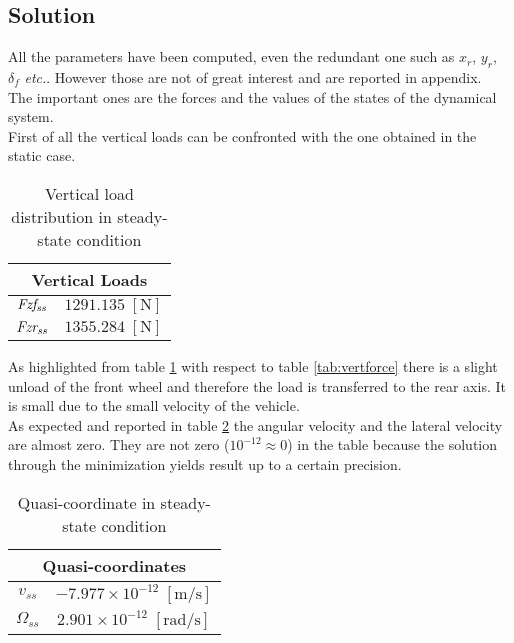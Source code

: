 \subsection{Solution}
%
All the parameters have been computed, even the redundant one such as $x_r$, $y_r$, $\delta_f$ \textit{etc.}. However those are not of great interest and are reported in appendix.\\ %
The important ones are the forces and the values of the states of the dynamical system.\\
First of all the vertical loads can be confronted with the one obtained in the static case.

%
\begin{table}[h!]
    \centering
    \begin{tabular}{@{}cc@{}}
    \toprule
    \multicolumn{2}{c}{\textbf{Vertical Loads}} \\ \midrule
    ${\it Fzf_{ss}}$  & $1291.135 \; [\si{\newton}]$ \\
    ${\it Fzr_{ss}}$  & $1355.284 \; [\si{\newton}]$ \\ \bottomrule
    \end{tabular}
    \caption{Vertical load distribution in steady-state condition}
    \label{tab:vertforceSS}
\end{table}
%
As highlighted from table \ref{tab:vertforceSS} with respect to table \ref{tab:vertforce} there is a slight unload of the front wheel and therefore the load is transferred to the rear axis. It is small due to the small velocity of the vehicle.\\
As expected and reported in table \ref{tab:QC-SS} the angular velocity and the lateral velocity are almost zero. They are not zero ($10^{-12}\approx 0$) in the table because the solution through the minimization yields result up to a certain precision.

%
\begin{table}[h!]
    \centering
    \begin{tabular}{@{}cc@{}}
    \toprule
    \multicolumn{2}{c}{\textbf{Quasi-coordinates}} \\ \midrule
    ${ v_{ss}    }$  & $-7.977\times10^{-12}  \; [\si{\metre/\second}]$ \\
    ${\Omega_{ss}}$  & $ 2.901\times10^{-12}  \; [\si{\radian/\second}]$ \\ \bottomrule
    \end{tabular}
    \caption{Quasi-coordinate in steady-state condition}
    \label{tab:QC-SS}
\end{table}
%

